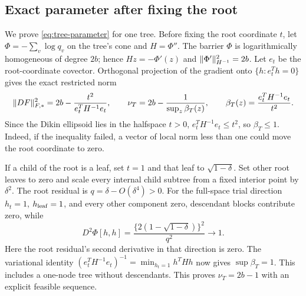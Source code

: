 \subsection{Exact parameter after fixing the root}
We prove \eqref{eq:tree-parameter} for one tree. Before fixing the root
coordinate $t$, let $\Phi=-\sum_v\log q_v$ on the tree's cone and
$H=\Phi''$. The barrier $\Phi$ is logarithmically homogeneous of degree $2b$; hence
$H z=-\Phi'(z)$ and $\lVert \Phi'\rVert_{H^{-1}}^2=2b$.
Let $e_t$ be the root-coordinate covector. Orthogonal projection
of the
gradient onto $\{h:e_t^Th=0\}$ gives the exact restricted norm
\begin{equation}
 \lVert DF\rVert_{F,*}^2=2b-\frac{t^2}{e_t^TH^{-1}e_t},\qquad
 \nu_T=2b-\frac1{\sup_z\beta_T(z)},\qquad
 \beta_T(z)=\frac{e_t^TH^{-1}e_t}{t^2}.
 \label{eq:root-leverage}
\end{equation}
Since the Dikin ellipsoid lies in the halfspace $t>0$,
$e_t^TH^{-1}e_t\leq t^2$, so $\beta_T\leq1$.
Indeed, if the inequality failed, a vector of local norm less than one
could move the root coordinate to zero.

If a child of the root is a leaf, set $t=1$ and that leaf to
$\sqrt{1-\delta}$. Set other root leaves to zero and scale every
internal child subtree from a fixed interior point by $\delta^2$.
The root residual is $q=\delta-O(\delta^4)>0$.
For the full-space trial direction $h_t=1$, $h_{\rm leaf}=1$, and every
other component zero, descendant blocks contribute zero, while
\[
 D^2\Phi[h,h]
 =\frac{\{2(1-\sqrt{1-\delta})\}^2}{q^2}\longrightarrow1.
\]
Here the root residual's second derivative in that direction is zero.
The variational identity
$(e_t^TH^{-1}e_t)^{-1}=\min_{h_t=1}h^THh$ now gives
$\sup\beta_T=1$. This includes a one-node tree without descendants.
This proves $\nu_T=2b-1$ with an explicit feasible sequence.

